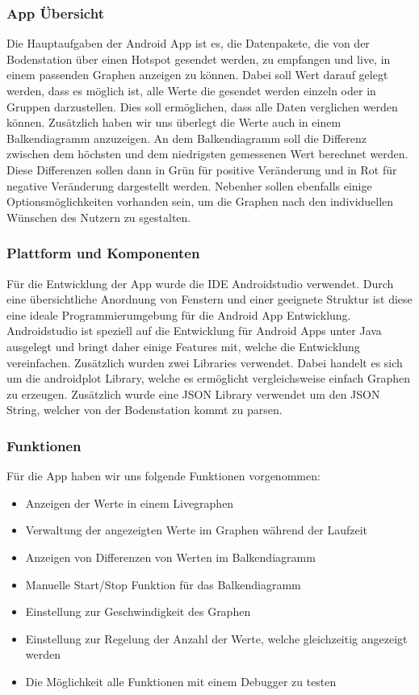 \subsubsection{App Übersicht}
Die Hauptaufgaben der Android App ist es, die Datenpakete, die von der Bodenstation über einen Hotspot gesendet werden, zu empfangen und live, in einem passenden Graphen anzeigen zu können. Dabei soll Wert darauf gelegt werden, dass es möglich ist, alle Werte die gesendet werden einzeln oder in Gruppen darzustellen. Dies soll ermöglichen, dass alle Daten verglichen werden können. Zusätzlich haben wir uns überlegt die Werte auch in einem Balkendiagramm anzuzeigen. An dem Balkendiagramm soll die Differenz zwischen dem höchsten und dem niedrigsten gemessenen Wert berechnet werden. Diese Differenzen sollen dann in Grün für positive Veränderung und in Rot für negative Veränderung dargestellt werden. Nebenher sollen ebenfalls einige Optionsmöglichkeiten vorhanden sein, um die Graphen nach den individuellen Wünschen des Nutzern zu sgestalten.

\subsubsection{Plattform und Komponenten}
Für die Entwicklung der App wurde die IDE Androidstudio verwendet. Durch eine übersichtliche Anordnung von Fenstern und einer geeignete Struktur ist diese eine ideale Programmierumgebung für die Android App Entwicklung. Androidstudio ist speziell auf die Entwicklung für Android Apps unter Java ausgelegt und bringt daher einige Features mit, welche die Entwicklung vereinfachen. Zusätzlich wurden zwei Libraries verwendet. Dabei handelt es sich um die androidplot Library, welche es ermöglicht vergleichsweise einfach Graphen zu erzeugen. Zusätzlich wurde eine JSON Library verwendet um den JSON String, welcher von der Bodenstation kommt zu parsen.
\subsubsection{Funktionen}
Für die App haben wir uns folgende Funktionen vorgenommen:
\begin{itemize}
	\item Anzeigen der Werte in einem Livegraphen
	\item Verwaltung der angezeigten Werte im Graphen während der Laufzeit
	\item Anzeigen von Differenzen von Werten im Balkendiagramm
	\item Manuelle Start/Stop Funktion für das Balkendiagramm
	\item Einstellung zur Geschwindigkeit des Graphen
	\item Einstellung zur Regelung der Anzahl der Werte, welche gleichzeitig angezeigt werden
	\item Die Möglichkeit alle Funktionen mit einem Debugger zu testen
\end{itemize}

